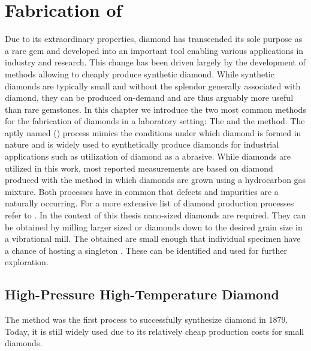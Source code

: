 
\chapter{Fabrication of \Nds}	\label{ch::fabrication_nanodiamonds}


	Due to its extraordinary properties, diamond has transcended its sole purpose as a rare gem and developed into an important tool enabling various applications in industry and research. This change has been driven largely by the development of methods allowing to cheaply produce synthetic diamond. While synthetic diamonds are typically small and without the splendor generally associated with diamond, they can be produced on-demand and are thus arguably more useful than rare gemstones.
	In this chapter we introduce the two most common methods for the fabrication of diamonds in a laboratory setting: The \hpht and the \cvd method.
	The aptly named \hpht (\HPHT) process mimics the conditions under which diamond is formed in nature and is widely used to synthetically produce diamonds for industrial applications such as utilization of diamond as a abrasive.
	While \HPHT diamonds are utilized in this work, most reported measurements are based on diamond produced with the \CVD method in which diamonds are grown using a hydrocarbon gas mixture. Both processes have in common that defects and impurities are a naturally occurring.
	For a more extensive list of diamond production processes refer to \cite{davis1993diamond}.
	In the context of this thesis nano-sized diamonds are required. They can be obtained by milling larger sized \HPHT or \CVD diamonds down to the desired grain size in a vibrational mill.
	The obtained \nds are small enough that individual specimen have a chance of hosting a singleton \siv. These can be identified and used for further exploration.

\section{High-Pressure High-Temperature Diamond}\label{sec::hpht}

	The \HPHT method was the first process to successfully synthesize diamond in 1879.
	Today, it is still widely used due to its relatively cheap production costs for small diamonds.

